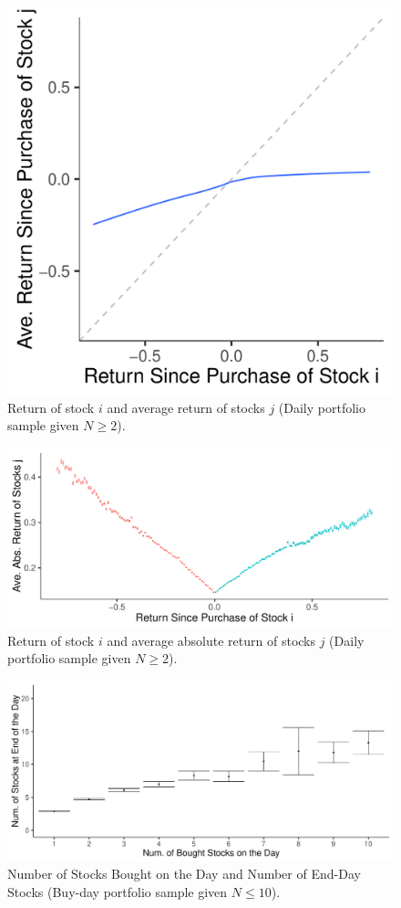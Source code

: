 \documentclass[11pt, a4paper]{article}
\begin{document}
\begin{appendices}
\begin{figure}[H]
	\centering
	\includegraphics[width=0.6\columnwidth]{barc_R_i_R_j.pdf}
	\caption{Return of stock $i$ and average return of stocks $j$ (Daily portfolio sample given $N\geq2$).}
	\label{figure:ret_i_j}
\end{figure}

\begin{figure}[H]
	\centering
	\includegraphics[width=0.8\columnwidth]{barc_R_i_abs_R_j.pdf}
	\caption{Return of stock $i$ and average absolute return of stocks $j$ (Daily portfolio sample given $N\geq2$).}
	\label{figure:ret_i_abs_j}
\end{figure}




\begin{figure}[H]
	\centering
	\includegraphics[width=0.8\columnwidth]{barc_buy_days_num_stocks.pdf}
	\caption{Number of Stocks Bought on the Day and Number of End-Day Stocks (Buy-day portfolio sample given $N\leq10$).}
	\label{num_buys_num_stocks}
\end{figure}



\end{appendices}
\end{document}
